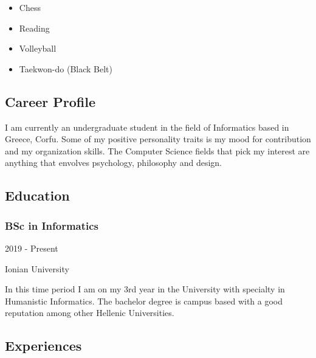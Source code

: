 \documentclass[english,]{article}
\providecommand{\tightlist}{%
  \setlength{\itemsep}{0pt}\setlength{\parskip}{0pt}}
\begin{document}
\begin{itemize}
\tightlist
\item
  Chess
\item
  Reading
\item
  Volleyball
\item
  Taekwon-do (Black Belt)
\end{itemize}

\hypertarget{career-profile}{%
\subsection{\texorpdfstring{{ \emph{} \emph{} } Career
Profile}{    Career Profile}}\label{career-profile}}

I am currently an undergraduate student in the field of Informatics
based in Greece, Corfu. Some of my positive personality traits is my
mood for contribution and my organization skills. The Computer Science
fields that pick my interest are anything that envolves psychology,
philosophy and design.

\hypertarget{education}{%
\subsection{\texorpdfstring{{ \emph{} \emph{} }
Education}{    Education}}\label{education}}

\hypertarget{bsc-in-informatics}{%
\subsubsection{BSc in Informatics}\label{bsc-in-informatics}}

2019 - Present

Ionian University

In this time period I am on my 3rd year in the University with specialty
in Humanistic Informatics. The bachelor degree is campus based with a
good reputation among other Hellenic Universities.

\hypertarget{experiences}{%
\subsection{\texorpdfstring{{ \emph{} \emph{} }
Experiences}{    Experiences}}\label{experiences}}

\hypertarget{section}{%
\subsubsection{}\label{section}}
\end{document}
